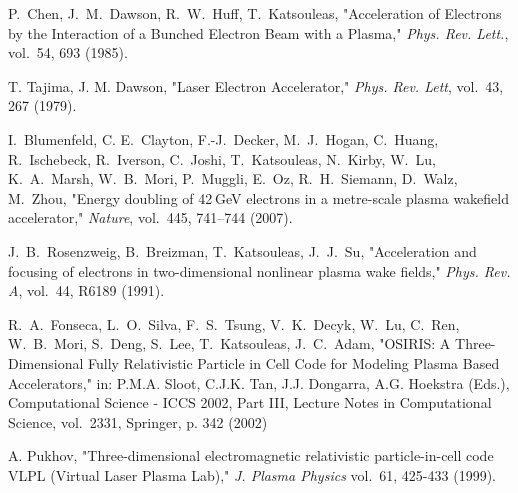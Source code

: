 \documentclass[twocolumn,showpacs,aip]{revtex4}
\begin{document}
%
%


\begin{thebibliography}{10}

	
   P.~Chen, J.~M.~Dawson, R.~W.~Huff, T.~Katsouleas, "Acceleration of Electrons by the Interaction of a Bunched Electron Beam with a Plasma,"
   {\em Phys. Rev. Lett.}, vol.~54, 693 (1985).	
	
     T. Tajima, J. M. Dawson, "Laser Electron Accelerator,"
	{\em Phys. Rev. Lett}, vol.~43, 267 (1979).

	
     I.~Blumenfeld, C. E.~Clayton, F.-J.~Decker, M.~J.~Hogan, C.~Huang, R.~Ischebeck, R.~Iverson, C.~Joshi, T.~Katsouleas, N.~Kirby, W.~Lu, K.~A.~Marsh, W.~B.~Mori, P.~Muggli, E.~Oz, R.~H.~Siemann, D.~Walz, M.~Zhou, "Energy doubling of 42 {GeV} electrons in a metre-scale plasma wakefield accelerator,"
      {\em Nature}, vol.~445, 741--744 (2007).
	

   J.~B.~Rosenzweig, B.~Breizman, T.~Katsouleas, J.~J.~Su, "Acceleration and focusing of electrons in two-dimensional nonlinear plasma wake fields," 
   {\em Phys. Rev. A}, vol.~44, R6189 (1991).


    R.~A.~Fonseca, L.~O.~Silva, F.~S.~Tsung, V.~K.~Decyk, W.~Lu, C.~Ren, W.~B.~Mori, S.~Deng, S.~Lee, T.~Katsouleas, J.~C.~Adam, "OSIRIS: A Three-Dimensional Fully Relativistic Particle in Cell Code for Modeling Plasma Based Accelerators," in: P.M.A. Sloot, C.J.K. Tan, J.J. Dongarra, A.G. Hoekstra (Eds.), Computational Science - ICCS 2002, Part III, Lecture Notes in Computational Science, vol.~2331, Springer, p. 342 (2002)

A. Pukhov, "Three-dimensional electromagnetic relativistic
particle-in-cell code VLPL
(Virtual Laser Plasma Lab),"
{\em J. Plasma Physics} vol.~61, 425-433 (1999).


\end{thebibliography}
\end{document}
